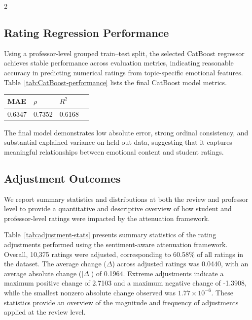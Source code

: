 \documentclass{article}
\begin{document}
\begin{multicols*}{2}
\subsection{Rating Regression Performance}
Using a professor-level grouped train–test split, the selected CatBoost regressor achieves stable performance across evaluation metrics, indicating reasonable accuracy in predicting numerical ratings from topic-specific emotional features. Table~\ref{tab:CatBoost-performance} lists the final CatBoost model metrics.\newline

\begin{center}
    \label{tab:CatBoost-performance}
    \begin{tabular}{lllc}
    \hline
    \textbf{MAE} & \textbf{$\rho$} & $\textbf{$R^2$}$ \\
    \hline
    0.6347  & 0.7352 & 0.6168\\
    \hline
    \end{tabular}
\end{center}

The final model demonstrates low absolute error, strong ordinal consistency, and substantial explained variance on held-out data, suggesting that it captures meaningful relationships between emotional content and student ratings. 

\subsection{Adjustment Outcomes}
We report summary statistics and distributions at both the review and professor level to provide a quantitative and descriptive overview of how student and professor-level ratings were impacted by the attenuation framework.

Table~\ref{tab:adjustment-stats} presents summary statistics of the rating adjustments performed using the sentiment-aware attenuation framework. Overall, 10,375 ratings were adjusted, corresponding to 60.58\% of all ratings in the dataset. The average change ($\Delta$) across adjusted ratings was 0.0440, with an average absolute change ($|\Delta|$) of 0.1964. Extreme adjustments indicate a maximum positive change of 2.7103 and a maximum negative change of -1.3908, while the smallest nonzero absolute change observed was $1.77\times10^{-6}$. These statistics provide an overview of the magnitude and frequency of adjustments applied at the review level.


\end{multicols*}
\end{document}
